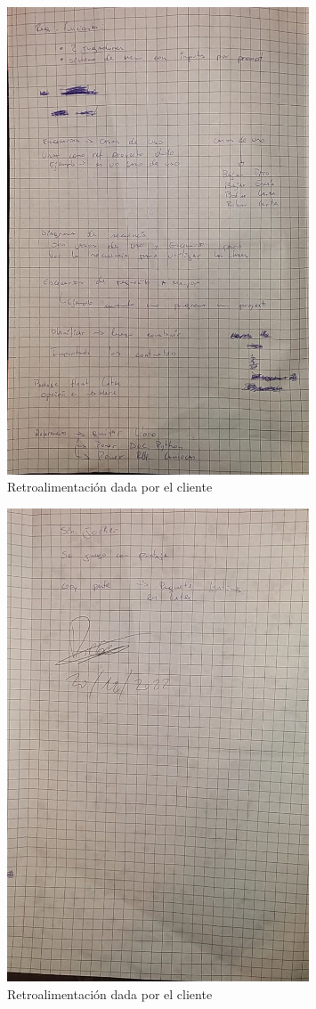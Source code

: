 \begin{figure}[H]
    \centering
    \includegraphics[width=0.8\textwidth]{imagenes/retroalimentacion2.jpg}
    \caption{Retroalimentación dada por el cliente}
    \label{fig:retroalimentacion2}
\end{figure}

\begin{figure}[H]
    \centering
    \includegraphics[width=0.8\textwidth]{imagenes/retroalimentacion3.jpg}
    \caption{Retroalimentación dada por el cliente}
    \label{fig:retroalimentacion3}
\end{figure}
\clearpage
